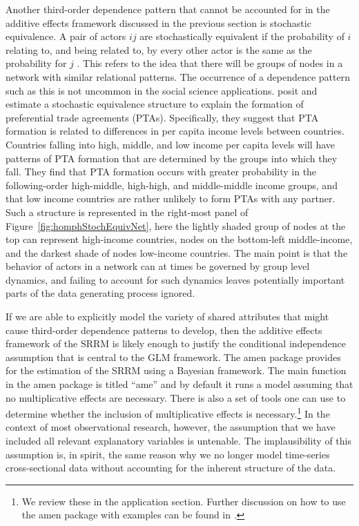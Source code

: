 \documentclass[12pt,pdflatex]{elsarticle}
\newcommand{\pkg}[1]{{\fontseries{b}\selectfont #1}}
\begin{document}
Another third-order dependence pattern that cannot be accounted for in the additive effects framework discussed in the previous section is stochastic equivalence. A pair of actors $ij$ are stochastically equivalent if the probability of $i$ relating to, and being related to, by every other actor is the same as the probability for $j$ \citep{anderson:etal:1992}. This refers to the idea that there will be groups of nodes in a network with similar relational patterns. The occurrence of a dependence pattern such as this is not uncommon in the social science applications. \citet{manger:etal:2012} posit and estimate a stochastic equivalence structure to explain the formation of preferential trade agreements (PTAs). Specifically, they suggest that PTA formation is related to differences in per capita income levels between countries. Countries falling into high, middle, and low income per capita levels will have patterns of PTA formation that are determined by the groups into which they fall. They find that PTA formation occurs with greater probability in the following-order high-middle, high-high, and middle-middle income groups, and that low income countries are rather unlikely to form PTAs with any partner. Such a structure is represented in the right-most panel of Figure~\ref{fig:homphStochEquivNet}, here the lightly shaded group of nodes at the top can represent high-income countries, nodes on the bottom-left middle-income, and the darkest shade of nodes low-income countries. The main point is that the behavior of actors in a network can at times be governed by group level dynamics, and failing to account for such dynamics leaves potentially important parts of the data generating process ignored. 

If we are able to explicitly model the variety of shared attributes that might cause third-order dependence patterns to develop, then the additive effects framework of the SRRM is likely enough to justify the conditional independence assumption that is central to the GLM framework. The \pkg{amen} package provides for the estimation of the SRRM using a Bayesian framework. The main function in the \pkg{amen} package is titled ``ame'' and by default it runs a model assuming that no multiplicative effects are necessary. There is also a set of tools one can use to determine whether the inclusion of multiplicative effects is necessary.\footnote{We review these in the application section. Further discussion on how to use the \pkg{amen} package with examples can be found in \citet{hoff:2015:arxiv}.} In the context of most observational research, however, the assumption that we have included all relevant explanatory variables is untenable. The implausibility of this assumption is, in spirit, the same reason why we no longer model time-series cross-sectional data without accounting for the inherent structure of the data.
\end{document}
